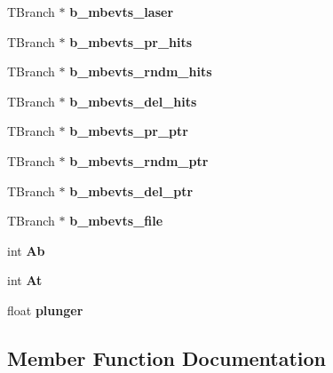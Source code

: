 \begin{DoxyCompactItemize}
T\+Branch $\ast$ {\bfseries b\+\_\+mbevts\+\_\+laser}
\item 
\mbox{\label{classg__clx_a65da8db31fa55fae0873a2e67a862bf7}} 
T\+Branch $\ast$ {\bfseries b\+\_\+mbevts\+\_\+pr\+\_\+hits}
\item 
\mbox{\label{classg__clx_a4c476be1f0e3227fce3ad74f91224929}} 
T\+Branch $\ast$ {\bfseries b\+\_\+mbevts\+\_\+rndm\+\_\+hits}
\item 
\mbox{\label{classg__clx_af8844a7d126f13b0932cf3d3ecce107b}} 
T\+Branch $\ast$ {\bfseries b\+\_\+mbevts\+\_\+del\+\_\+hits}
\item 
\mbox{\label{classg__clx_a249297b5ba9a24c75c59f6055e9fe061}} 
T\+Branch $\ast$ {\bfseries b\+\_\+mbevts\+\_\+pr\+\_\+ptr}
\item 
\mbox{\label{classg__clx_a7401209db4725c74c75d38e15a6b2d11}} 
T\+Branch $\ast$ {\bfseries b\+\_\+mbevts\+\_\+rndm\+\_\+ptr}
\item 
\mbox{\label{classg__clx_abb8b9787037a50733cc8f2efb64fadba}} 
T\+Branch $\ast$ {\bfseries b\+\_\+mbevts\+\_\+del\+\_\+ptr}
\item 
\mbox{\label{classg__clx_a59f6b47f4c944b311e6dd5a0abb103c5}} 
T\+Branch $\ast$ {\bfseries b\+\_\+mbevts\+\_\+file}
\item 
\mbox{\label{classg__clx_a3ecad3ddd660369644dafb28e0bfe26d}} 
int {\bfseries Ab}
\item 
\mbox{\label{classg__clx_a357526f9a06f3059124825bbf6c7a790}} 
int {\bfseries At}
\item 
\mbox{\label{classg__clx_aee52e53d2cd780936d648225402d8bcf}} 
float {\bfseries plunger}
\end{DoxyCompactItemize}


\subsection{Member Function Documentation}
\mbox{\label{classg__clx_a9d5de859df4bfbb746726661ff1d24a9}} 
